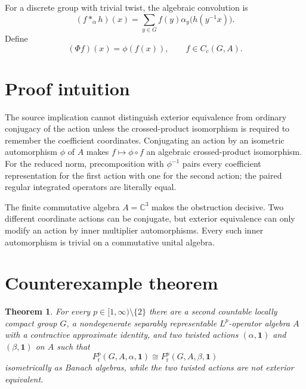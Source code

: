 \documentclass[11pt]{article}
\newtheorem{theorem}{Theorem}
\newcommand{\C}{\mathbb C}
\newcommand{\Fr}{F_{\mathrm r}^{p}}
\begin{document}
For a discrete group with trivial twist, the algebraic convolution is
\[
 (f*_{\alpha}h)(x)
 =\sum_{y\in G} f(y)\alpha_y\bigl(h(y^{-1}x)\bigr).
\]
Define
\begin{equation}\label{eq:Phi}
 (\Phi f)(x)=\phi(f(x)),\qquad f\in C_c(G,A).
\end{equation}

\section{Proof intuition}

The source implication cannot distinguish exterior equivalence from ordinary
conjugacy of the action unless the crossed-product isomorphism is required to
remember the coefficient coordinates.  Conjugating an action by an isometric
automorphism $\phi$ of $A$ makes $f\mapsto\phi\circ f$ an algebraic crossed-product
isomorphism.  For the reduced norm, precomposition with $\phi^{-1}$ pairs every
coefficient representation for the first action with one for the second action;
the paired regular integrated operators are literally equal.

The finite commutative algebra $A=\C^3$ makes the obstruction decisive.  Two
different coordinate actions can be conjugate, but exterior equivalence can
only modify an action by inner multiplier automorphisms.  Every such inner
automorphism is trivial on a commutative unital algebra.

\section{Counterexample theorem}

\begin{theorem}\label{thm:counterexample}
For every $p\in[1,\infty)\setminus\{2\}$ there are a second countable locally
compact group $G$, a nondegenerate separably representable $L^p$-operator algebra
$A$ with a contractive approximate identity, and two twisted actions
$(\alpha,\mathbf1)$ and $(\beta,\mathbf1)$ on $A$ such that
\[
 \Fr(G,A,\alpha,\mathbf1)
 \cong
 \Fr(G,A,\beta,\mathbf1)
\]
isometrically as Banach algebras, while the two twisted actions are not exterior
equivalent.
\end{theorem}
\end{document}
